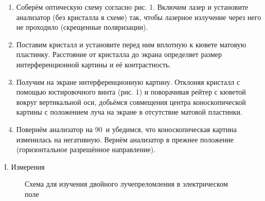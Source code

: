 \begin{enumerate}

    \item 
    Соберём оптическую схему согласно рис. 1. Включим лазер и установите анализатор (без кристалла в схеме) так, чтобы лазерное излучение через него не проходило (скрещенные поляризации).
    
    \item
    Поставим кристалл и установите перед ним вплотную к кювете матовую пластинку. Расстояние от кристалла до экрана определяет размер интерференционной картины и её контрастность.
    
    \item
    Получим на экране интерференционную картину. Отклоняя кристалл с помощью юстировочного винта (рис. 1) и поворачивая рейтер с кюветой вокруг вертикальной оси, добьёмся совмещения центра коноскопической картины с положением луча на экране в отсутствие матовой пластинки.
    
    \item
    Повернём анализатор на 90\textdegree~и убедимся, что коноскопическая картина изменилась на негативную. Вернём анализатор в прежнее положение (горизонтальное разрешённое направление).
    
\end{enumerate}

\begin{center}
I. Измерения
\end{center}

\begin{figure}[h]
    \caption{Схема для изучения двойного лучепреломления в электрическом поле}
\end{figure}

